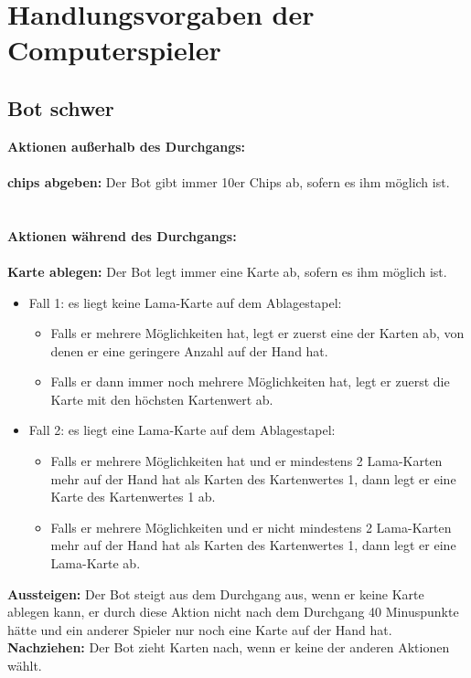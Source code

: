

\chapter{Handlungsvorgaben der Computerspieler}

\section{Bot schwer}
\textbf{Aktionen außerhalb des Durchgangs:} \\ \\
\textbf{chips abgeben:} Der Bot gibt immer 10er Chips ab, sofern es ihm möglich ist. \\
\\ \\
\textbf{Aktionen während des Durchgangs:} \\ \\
\textbf{Karte ablegen:} Der Bot legt immer eine Karte ab, sofern es ihm möglich ist. \\
\begin{itemize}
	\item Fall 1: es liegt keine Lama-Karte auf dem Ablagestapel:
	\begin{itemize}
		\item Falls er mehrere Möglichkeiten hat, legt er zuerst eine der Karten ab, von denen er eine geringere Anzahl auf der Hand hat.
		\item Falls er dann immer noch mehrere Möglichkeiten hat, legt er zuerst die Karte mit den höchsten Kartenwert ab.
		\end{itemize}
	\item Fall 2: es liegt eine Lama-Karte auf dem Ablagestapel:
	\begin{itemize}
	    \item Falls er mehrere Möglichkeiten hat und er mindestens 2 Lama-Karten mehr auf der Hand hat als Karten des Kartenwertes 1, dann legt er eine Karte des Kartenwertes 1 ab.
		\item Falls er mehrere Möglichkeiten und er nicht mindestens 2 Lama-Karten mehr auf der Hand hat als Karten des Kartenwertes 1, dann legt er eine Lama-Karte ab.
		\end{itemize}
\end{itemize}
\textbf{Aussteigen:} Der Bot steigt aus dem Durchgang aus, wenn er keine Karte ablegen kann, er durch diese Aktion nicht nach dem Durchgang 40 Minuspunkte hätte und ein anderer Spieler nur noch eine Karte auf der Hand hat.\\
\textbf{Nachziehen:} Der Bot zieht Karten nach, wenn er keine der anderen Aktionen wählt.

